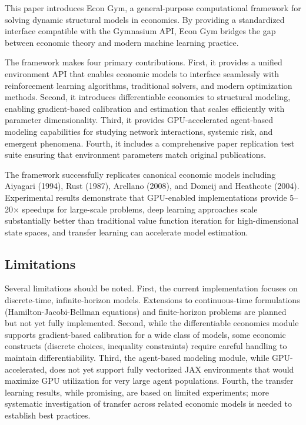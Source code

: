 \documentclass[12pt]{article}
\begin{document}
This paper introduces Econ Gym, a general-purpose computational framework for solving dynamic structural models in economics. By providing a standardized interface compatible with the Gymnasium API, Econ Gym bridges the gap between economic theory and modern machine learning practice.

The framework makes four primary contributions. First, it provides a unified environment API that enables economic models to interface seamlessly with reinforcement learning algorithms, traditional solvers, and modern optimization methods. Second, it introduces differentiable economics to structural modeling, enabling gradient-based calibration and estimation that scales efficiently with parameter dimensionality. Third, it provides GPU-accelerated agent-based modeling capabilities for studying network interactions, systemic risk, and emergent phenomena. Fourth, it includes a comprehensive paper replication test suite ensuring that environment parameters match original publications.

The framework successfully replicates canonical economic models including Aiyagari (1994), Rust (1987), Arellano (2008), and Domeij and Heathcote (2004). Experimental results demonstrate that GPU-enabled implementations provide 5--20$\times$ speedups for large-scale problems, deep learning approaches scale substantially better than traditional value function iteration for high-dimensional state spaces, and transfer learning can accelerate model estimation.

\subsection{Limitations}

Several limitations should be noted. First, the current implementation focuses on discrete-time, infinite-horizon models. Extensions to continuous-time formulations (Hamilton-Jacobi-Bellman equations) and finite-horizon problems are planned but not yet fully implemented. Second, while the differentiable economics module supports gradient-based calibration for a wide class of models, some economic constructs (discrete choices, inequality constraints) require careful handling to maintain differentiability. Third, the agent-based modeling module, while GPU-accelerated, does not yet support fully vectorized JAX environments that would maximize GPU utilization for very large agent populations. Fourth, the transfer learning results, while promising, are based on limited experiments; more systematic investigation of transfer across related economic models is needed to establish best practices.
\end{document}
